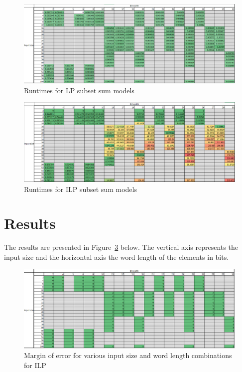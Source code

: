 \documentclass{report}
\begin{document}
\begin{figure}[h]
\centering
\includegraphics[width=12cm]{p4_LP_rt.png}
\caption{Runtimes for LP subset sum models}
\label{fig:lp_rt}
\end{figure}

\begin{figure}[h]
\centering
\includegraphics[width=12cm]{p4_ILP_rt.png}
\caption{Runtimes for ILP subset sum models}
\label{fig:ilp_rt}
\end{figure}

\section{Results}

The results are presented in Figure~\ref{fig:ilp} below. The vertical axis represents the
input size and the horizontal axis the word length of the elements in bits.

\begin{figure}[h]
\centering
\includegraphics[width=12cm]{p4_ILP_mg.png}
\caption{Margin of error for various input size and word length combinations for ILP}
\label{fig:ilp}
\end{figure}
\end{document}
